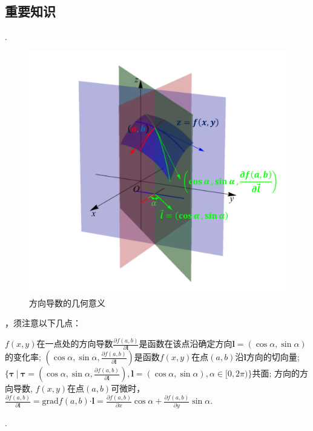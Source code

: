 \documentclass[12pt,UTF8]{ctexart}
\newcommand\Set[2]{\{#1\ \vert\ #2 \}}
\begin{document}
\subsection{重要知识}
\begin{enumerate}
.
\begin{figure}[H]
\begin{center}
\includegraphics[height=0.6\textheight,angle=0]{Figures20190609/directedderivative.pdf}
\end{center}
\caption{方向导数的几何意义}
\end{figure}
，须注意以下几点：
\begin{enumerate}
$f(x,y)$在一点处的方向导数$\frac{\partial f(a,b)}{\partial\bm l}$是函数在该点沿确定方向$\bm l=(\cos\alpha,\sin\alpha)$的变化率;
$(\cos\alpha,\sin\alpha,\frac{\partial f(a,b)}{\partial\bm l})$是函数$f(x,y)$在点$(a,b)$沿$\bm l$方向的切向量;
$\Set{\bm\tau}{\bm\tau=(\cos\alpha,\sin\alpha,\frac{\partial f(a,b)}{\partial\bm l}),\bm l=(\cos\alpha,\sin\alpha),\alpha\in[0,2\pi)}$共面;
方向的方向导数,
$f(x,y)$在点$(a,b)$可微时，$\frac{\partial f(a,b)}{\partial\bm l}=\text{grad}f(a,b)\bm\cdot\bm l=\frac{\partial f(a,b)}{\partial x}\cos\alpha+\frac{\partial f(a,b)}{\partial y}\sin\alpha$.
\end{enumerate}
.

\end{enumerate}
\end{document}
